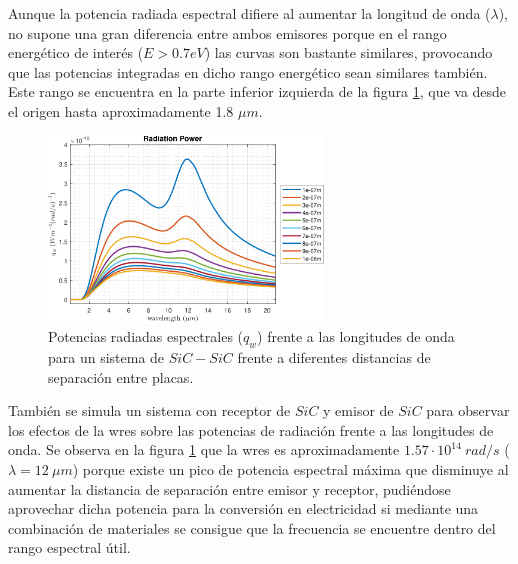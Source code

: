 Aunque la potencia radiada espectral difiere al aumentar la longitud de onda ($\lambda$), no supone una gran diferencia entre ambos emisores porque en el rango energético de interés ($E>0.7eV$) las curvas son bastante similares, provocando que las potencias integradas en dicho rango energético sean similares también. Este rango se encuentra en la parte inferior izquierda de la figura \ref{fig:SiCSiC}, que va desde el origen hasta aproximadamente 1.8 $\mu m$.
\begin{figure}[H]
	\centering
		\includegraphics[width=0.65\textwidth]{figuras/Resultados/radiacion/SiCSiC.pdf}
	\caption{Potencias radiadas espectrales ($q_w$) frente a las longitudes de onda para un sistema de $SiC-SiC$ frente a diferentes distancias de separación entre placas.}
	\label{fig:SiCSiC}
\end{figure}
También se simula un sistema con receptor de $SiC$ y emisor de $SiC$ para observar los efectos de la \gls{wres} sobre las potencias de radiación frente a las longitudes de onda. Se observa en la figura \ref{fig:SiCSiC} que la \gls{wres} es aproximadamente $1.57\cdot 10^{14} \ rad/s$ ($\lambda = 12\ \mu m$) porque existe un pico de potencia espectral máxima que disminuye al aumentar la distancia de separación entre emisor y receptor, pudiéndose aprovechar dicha potencia para la conversión en electricidad si mediante una combinación de materiales se consigue que la frecuencia se encuentre dentro del rango espectral útil.
